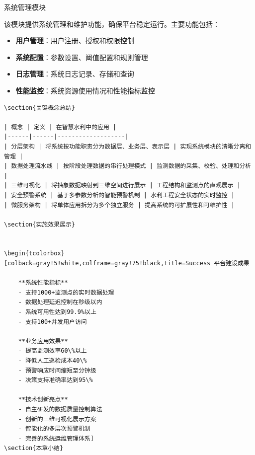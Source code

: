  系统管理模块

该模块提供系统管理和维护功能，确保平台稳定运行。主要功能包括：

\begin{itemize}
\tightlist
\item
  \textbf{用户管理}：用户注册、授权和权限控制
\item
  \textbf{系统配置}：参数设置、阈值配置和规则管理
\item
  \textbf{日志管理}：系统日志记录、存储和查询
\item
  \textbf{性能监控}：系统资源使用情况和性能指标监控
\end{itemize}

\begin{lstlisting}
\section{关键概念总结}

| 概念 | 定义 | 在智慧水利中的应用 |
|------|------|-------------------|
| 分层架构 | 将系统按功能职责分为数据层、业务层、表示层 | 实现系统模块的清晰分离和管理 |
| 数据处理流水线 | 按阶段处理数据的串行处理模式 | 监测数据的采集、校验、处理和分析 |
| 三维可视化 | 将抽象数据映射到三维空间进行展示 | 工程结构和监测点的直观展示 |
| 安全预警系统 | 基于多参数分析的智能预警机制 | 水利工程安全状态的实时监控 |
| 微服务架构 | 将单体应用拆分为多个独立服务 | 提高系统的可扩展性和可维护性 |

\section{实施效果展示}


\begin{tcolorbox}[colback=gray!5!white,colframe=gray!75!black,title=Success 平台建设成果
    
    **系统性能指标**
    - 支持1000+监测点的实时数据处理
    - 数据处理延迟控制在秒级以内
    - 系统可用性达到99.9%以上
    - 支持100+并发用户访问
    
    **业务应用效果**
    - 提高监测效率60\%以上
    - 降低人工巡检成本40\%
    - 预警响应时间缩短至分钟级
    - 决策支持准确率达到95\%
    
    **技术创新亮点**
    - 自主研发的数据质量控制算法
    - 创新的三维可视化展示方案
    - 智能化的多层次预警机制
    - 完善的系统运维管理体系]
\section{本章小结}


\end{lstlisting}
